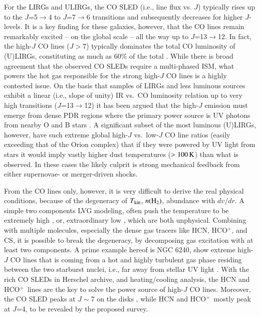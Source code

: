 \documentclass[legal,11pt]{article}
\def\,{\thinspace}
\def\Tkin{$T_{\rm kin}$}
\def\to{$\rightarrow$}
\def\nHtwo{$n({\rm H}_2)$}
\def\HCOP       {HCO$^{+}$}
\begin{document}
For the LIRGs and ULIRGs, the CO SLED (i.e., line flux vs. $J$) typically rises
up to the $J$=5\to4 to $J$=7\to6 transitions and subsequently decreases for
higher $J$-levels. It is a key finding for these galaxies, however, that the CO
lines remain remarkably excited -- on the global scale -- all the way up to
$J$=13\to12. In fact, the high-$J$ CO lines ($J > 7$) typically dominates the
total CO luminosity of (U)LIRGs, constituting as much as 60\% of the total
\citep[e.g.,][]{Greve14,Kamenetzky2014}. While there is broad agreement that
the observed CO SLEDs require a multi-phased ISM, what powers the hot gas
responsible for the strong high-$J$ CO lines is a highly contested issue. On
the basis that samples of LIRGs and less luminous sources exhibit a linear
(i.e., slope of unity) IR vs.\ CO luminosity relation up to very high
transitions ($J$=13\to12) it has been argued that the high-$J$ emission must
emerge from dense PDR regions where the primary power source is UV photons from
nearby O and B stars \citep[e.g.,][]{LGI2015}. A significant subset of the most
luminous (U)LIRGs, however, have such extreme global high-$J$ vs.\ low-$J$ CO
line ratios (easily exceeding that of the Orion complex) that if they were
powered by UV light from stars it would imply vastly higher dust temperatures
($>100\,{\rm K}$) than what is observed\citep[ $\sim 40\,{\rm K}$
e.g.,][]{Greve14}. In these cases the likely culprit is strong mechanical
feedback from either supernovae- or merger-driven shocks.  



From the CO lines only, however, it is very difficult to derive the real
physical conditions, because of the degeneracy of \Tkin, \nHtwo, abundance with
$dv/dr$. A simple two components LVG modeling, often push the temperature to be
extremely high \citep[$>1000 -- 5000$ K; e.g.,][]{Schirm2014}, or,
extraordinary low \citep[barely above the CMB temperature; e.g.,][]{Glenn2015},
which are both unphysical. Combining with multiple molecules, especially the
dense gas tracers like HCN, \HCOP, and CS, it is possible to break the
degeneracy, by decomposing  gas excitation with at least two components.  A
prime example hereof is NGC 6240, show extreme high-$J$ CO lines that is coming
from a hot and highly turbulent gas phase residing between the two starburst
nuclei, i.e., far away from stellar UV light \citep[e.g.,][]{PPP2014,
Tunnard2015}. With the rich CO SLEDs in Herschel archive, and heating/cooling
analysis, the HCN and \HCOP\ lines are the key to solve the power source of
high-$J$ CO lines.  Moreover, the CO SLED peaks at $J\sim$7 on the disks
\citep[FTS results; e.g.,][]{lzx2014, lzx2015, LGI2015}, while HCN and \HCOP\
mostly peak at $J$=4, to be revealed by the proposed survey. 
\end{document}
